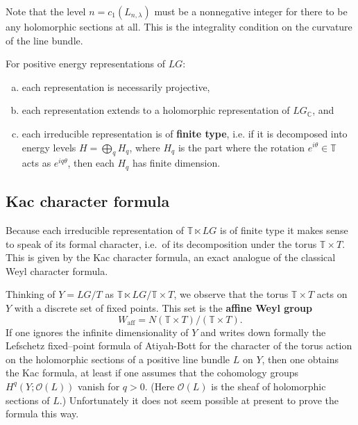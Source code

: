 \documentclass[12pt]{article}
\begin{document}
\begin{remark}
    Note that the level $n = c_1(L_{n,\lambda})$ must be a nonnegative integer for there to be any holomorphic sections at all. This is the integrality condition on the curvature of the line bundle. 
\end{remark}

\begin{corollary}[4.3]
For positive energy representations of $LG$:
\begin{enumerate}[(a)]
\item each representation is necessarily projective,
\item each representation extends to a holomorphic representation
of $LG_{\mathbb{C}}$, and
\item each irreducible representation is of \textbf{finite type}, i.e.
if it is decomposed into energy levels
$H = \bigoplus_q H_q$, where $H_q$ is the part where the rotation
$e^{i\theta} \in \mathbb{T}$ acts as $e^{iq\theta}$,
then each $H_q$ has finite dimension.
\end{enumerate}
\end{corollary}

\subsection{Kac character formula}
Because each irreducible representation of $\mathbb{T} \ltimes LG$
is of finite type it makes sense to speak of its formal character,
i.e.\ of its decomposition under the torus
$\mathbb{T} \times T$.  This is given by the Kac character formula,
an exact analogue of the classical Weyl character formula.

Thinking of $Y = LG/T$ as $\mathbb{T} \ltimes LG / \mathbb{T} \times T$,
we observe that the torus $\mathbb{T} \times T$ acts on $Y$
with a discrete set of fixed points.
This set is the \textbf{affine Weyl group}
\[
W_{\mathrm{aff}}
= N(\mathbb{T} \times T) / (\mathbb{T} \times T).
\]
If one ignores the infinite dimensionality of $Y$ and writes down formally
the Lefschetz fixed--point formula of Atiyah-Bott
for the character of the torus action on the holomorphic sections
of a positive line bundle $L$ on $Y$,
then one obtains the Kac formula,
at least if one assumes that the cohomology groups
$H^q(Y; \mathcal{O}(L))$ vanish for $q>0$.
(Here $\mathcal{O}(L)$ is the sheaf of holomorphic sections of $L$.)
Unfortunately it does not seem possible at present to prove the formula this way.
\end{document}

